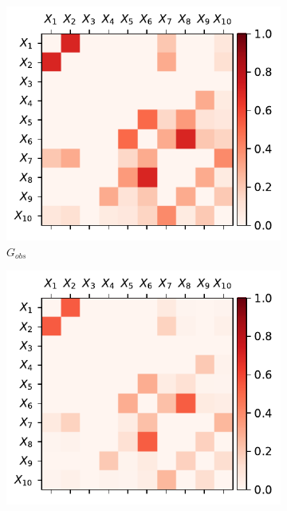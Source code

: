 \documentclass[../Thesis.tex]{subfiles}
\begin{document}
\begin{figure}[ht]
    \centering
    \begin{subfigure}[t]{0.49\textwidth}
        \centering
        \includegraphics[width=.95\linewidth]{figures/Gaussian Network Theoretical/symmetric G obs - cor.pdf}
        \caption{$G_{obs}$}
    \end{subfigure}
    \hfill
    \begin{subfigure}[t]{0.49\textwidth}
        \centering
        \includegraphics[width=.95\linewidth]{figures/Gaussian Network Theoretical/G dir from symmetric G obs - cor.pdf}

\end{subfigure}
\end{figure}
\end{document}

